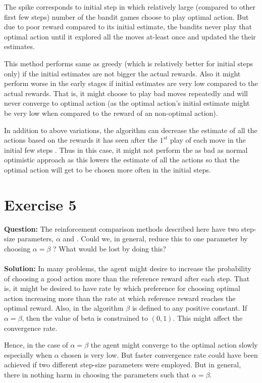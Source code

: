 \documentclass[a4paper,10pt]{report}
\begin{document}
The spike corresponds to initial step in which relatively large (compared to other first few steps) number of the bandit games choose to play optimal action. But due to poor reward compared to its initial estimate, the bandits never play that optimal action until it explored all the moves at-least once and updated the their estimates.

This method performs same as greedy (which is relatively better for initial steps only) if the initial estimates are not bigger the actual rewards. Also it might perform worse in the early stages if initial estimates are very low compared to the actual rewards. That is, it might choose to play bad moves repeatedly and will never converge to optimal action (as the optimal action's initial estimate might be very low when compared to the reward of an non-optimal action).

In addition to above variations, the algorithm can decrease the estimate of all the actions based on the rewards it has seen after the $1^{st}$ play of each move in the initial few steps . Thus in this case, it might not perform the as bad as normal optimistic approach as this lowers the estimate of all the actions so that the optimal action will get to be chosen more often in the initial steps.

\section{Exercise 5}
\textbf{Question:}
The reinforcement comparison methods described here have two step-size parameters, $\alpha$ and . Could we, in general, reduce this to one parameter by choosing $\alpha=\beta$ ? What would be lost by doing this?
\\\\
\textbf{Solution:} In many problems, the agent might desire to increase the probability of choosing a good action more than the reference reward after each step. That is, it might be desired to have rate by which preference for choosing optimal action increasing more than the rate at which reference reward reaches the optimal reward. Also, in the algorithm $\beta$ is defined to any positive constant. If $\alpha=\beta$, then the value of beta is constrained to $(0, 1)$. This might affect the convergence rate.

Hence, in the case of $\alpha=\beta$ the agent might converge to the optimal action slowly especially when $\alpha$ chosen is very low. But faster convergence rate could have been achieved if two different step-size parameters were employed. But in general, there in nothing harm in choosing the parameters such that $\alpha=\beta$.
\end{document}
